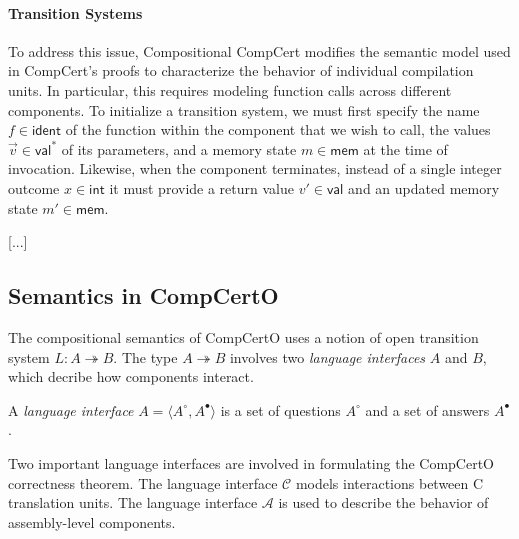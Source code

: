 \documentclass[acmsmall,screen,review,anonymous]{acmart}
\newcommand{\kw}[1]{\ensuremath{ \mathsf{#1} }}
\newcommand{\que}{\circ}
\newcommand{\ans}{\bullet}
\begin{document}
\paragraph{Transition Systems}

To address this issue,
Compositional CompCert \cite{compcompcert}
modifies the semantic model
used in CompCert's proofs
to characterize the behavior of individual compilation units.
In particular,
this requires modeling function calls across different components.
To initialize a transition system,
we must first specify the name $f \in \kw{ident}$
of the function within the component that we wish to call,
the values $\vec{v} \in \kw{val}^*$ of its parameters,
and a memory state $m \in \kw{mem}$ at the time of invocation.
Likewise,
when the component terminates,
instead of a single integer outcome $x \in \kw{int}$ it must provide
a return value $v' \in \kw{val}$ and an updated memory state $m' \in \kw{mem}$.

[...]

\subsection{Semantics in CompCertO} %


The compositional semantics of CompCertO uses %
a notion of open transition system $L : A \twoheadrightarrow B$.
The type $A \twoheadrightarrow B$ involves
two \emph{language interfaces} $A$ and $B$,
which decribe how components interact.

\begin{definition} \label{def:li} %
A \emph{language interface} $A = \langle A^\que, A^\ans \rangle$
is a set of questions $A^\que$ and a set of answers $A^\ans$.
\end{definition}

Two important language interfaces
are involved in formulating the CompCertO correctness theorem.
The language interface $\mathcal{C}$
models interactions between C translation units.
The language interface $\mathcal{A}$
is used to describe the behavior of assembly-level components.
\end{document}

